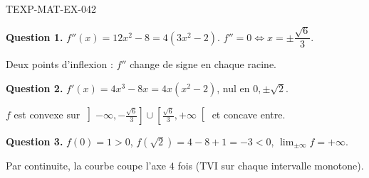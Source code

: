 \begin{corrige}{TEXP-MAT-EX-042}

\textbf{Question 1.} $f''(x) = 12x^2 - 8 = 4(3x^2-2)$. $f'' = 0 \iff x = \pm\dfrac{\sqrt{6}}{3}$.


Deux points d'inflexion : $f''$ change de signe en chaque racine.

\textbf{Question 2.} $f'(x) = 4x^3 - 8x = 4x(x^2-2)$, nul en $0, \pm\sqrt{2}$.

$f$ est convexe sur $\left]-\infty, -\frac{\sqrt6}{3}\right] \cup \left[\frac{\sqrt6}{3}, +\infty\right[$ et concave entre.

\textbf{Question 3.} $f(0)=1>0$, $f(\sqrt2) = 4-8+1 = -3 < 0$, $\lim_{\pm\infty} f = +\infty$.

Par continuite, la courbe coupe l'axe $4$ fois (TVI sur chaque intervalle monotone).

\end{corrige}
